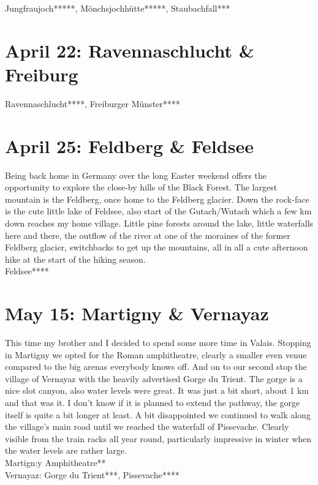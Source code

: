 Jungfraujoch*****, M\"onchsjochh\"utte*****, Staubachfall***

\section{April 22: Ravennaschlucht \& Freiburg}
\label{Freiburg2011}

Ravennaschlucht****, Freiburger M\"unster****

\section{April 25: Feldberg \& Feldsee}
\label{Feldsee}

Being back home in Germany over the long Easter weekend offers the opportunity to explore the close-by hills of the Black Forest. The largest mountain is the Feldberg, once home to the Feldberg glacier. Down the rock-face is the cute little lake of Feldsee, also start of the Gutach/Wutach which a few km down reaches my home village. Little pine forests around the lake, little waterfalls here and there, the outflow of the river at one of the moraines of the former Feldberg glacier, switchbacks to get up the mountains, all in all a cute afternoon hike at the start of the hiking season.\\

Feldsee****

\section{May 15: Martigny \& Vernayaz}
\label{Martigny2011}

This time my brother and I decided to spend some more time in Valais. Stopping in Martigny we opted for the Roman amphitheatre, clearly a smaller even venue compared to the big arenas everybody knows off. And on to our second stop the village of Vernayaz with the heavily advertised Gorge du Trient. The gorge is a nice slot canyon, also water levels were great. It was just a bit short, about 1 km and that was it. I don't know if it is planned to extend the pathway, the gorge itself is quite a bit longer at least. A bit disappointed we continued to walk along the village's main road until we reached the waterfall of Pissevache. Clearly visible from the train racks all year round, particularly impressive in winter when the water levels are rather large.\\

Martign:y Amphitheatre**\\
Vernayaz: Gorge du Trient***, Pissevache****\\

